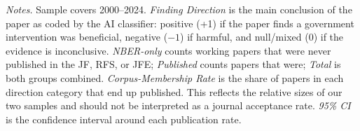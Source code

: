 \documentclass[12pt]{article}
\begin{document}
\begin{table}[H]
\centering
\caption{Corpus-Membership Rates by Finding Direction}
\label{tab:pub_rates}
\begin{singlespace}
\par\smallskip
\begin{minipage}{\textwidth}
\small
\textit{Notes.} Sample covers 2000--2024.
\textit{Finding Direction} is the main conclusion of the paper as coded by
the AI classifier: positive (+1) if the paper finds a government intervention
was beneficial, negative ($-1$) if harmful, and null/mixed (0) if the evidence
is inconclusive.
\textit{NBER-only} counts working papers that were never published in the JF,
RFS, or JFE; \textit{Published} counts papers that were; \textit{Total} is
both groups combined.
\textit{Corpus-Membership Rate} is the share of papers in each direction category
that end up published.  This reflects the relative sizes of our two samples
and should not be interpreted as a journal acceptance rate.
\textit{95\% CI} is the confidence interval around each publication rate.
\end{minipage}
\end{singlespace}
\end{table}
\end{document}
